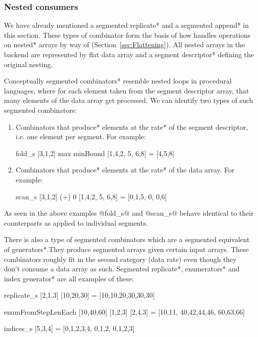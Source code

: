 \documentclass[preamble.tex]{subfiles}
\begin{document}
\subsubsection{Nested consumers}

We have already mentioned a \*segmented replicate* and a \*segmented append* in this section. These types of combinator form the basis of how \DPH handles operations on \*nested* arrays by way of  (Section~\ref{sec:Flattening}). All nested arrays in the \DPH backend are represented by flat data array and a \*segment descriptor* defining the original nesting.

Conceptually \*segmented combinators* resemble nested loops in procedural languages, where for each element taken from the segment descriptor array, that many elements of the data array get processed. We can identify two types of such segmented combinators:
\begin{enumerate}
\item Combinators that \*produce* elements at the \*rate* of the segment descriptor, i.e. one element per segment. For example:

\begin{hscode}
fold_s [3,1,2] max minBound [1,4,2, 5, 6,8] = [4,5,8]
\end{hscode}

\item Combinators that \*produce* elements at the \*rate* of the data array. For example:

\begin{hscode}
scan_s [3,1,2] (+) 0 [1,4,2, 5, 6,8] = [0,1,5, 0, 0,6]
\end{hscode}
\end{enumerate}

As seen in the above examples @fold_s@ and @scan_s@ behave identical to their  counterparts as applied to individual segments.

There is also a type of segmented combinators which are a segmented equivalent of \*generators*.\igencomb They produce segmented arrays given certain input arrays. These combinators roughly fit in the second category (data rate) even though they don't consume a data array as such. \*Segmented replicate*, \*enumerators* and \*index generator* are all examples of these:

\begin{hscode}
replicate_s [2,1,3] [10,20,30] = [10,10,20,30,30,30]

enumFromStepLenEach [10,40,60] [1,2,3] [2,4,3]
  = [10,11, 40,42,44,46, 60,63,66]

indices_s [5,3,4] = [0,1,2,3,4, 0,1,2, 0,1,2,3]
\end{hscode}
\end{document}
